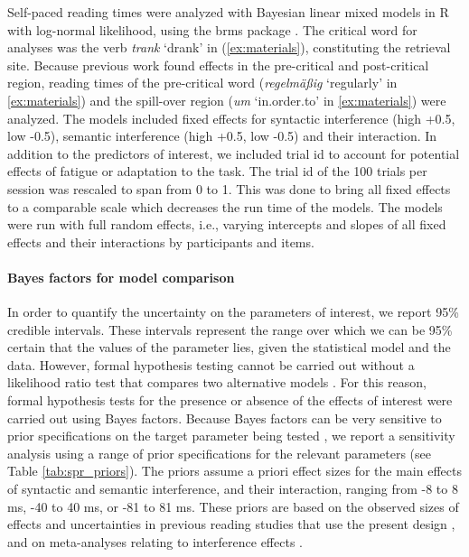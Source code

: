 \documentclass[review,preprint,12pt,authoryear,floatsintext]{elsarticle}
\begin{document}
Self-paced reading times were analyzed with Bayesian linear mixed models in R \citep{r} with log-normal likelihood, using the brms package \citep{brms}. The critical word for analyses was the verb \textit{trank} `drank' in (\ref{ex:materials}), constituting the retrieval site. Because previous work found effects in the pre-critical and post-critical region, reading times of the pre-critical word (\textit{regelmäßig} `regularly' in \ref{ex:materials}) and the spill-over region (\textit{um} `in.order.to' in \ref{ex:materials}) were analyzed. 
The models included fixed effects for syntactic interference (high +0.5, low -0.5), semantic interference (high +0.5, low -0.5) and their interaction. In addition to the predictors of interest, we included trial id to account for potential effects of fatigue or adaptation to the task. The trial id of the 100 trials per session was rescaled to span from 0 to 1. This was done to bring all fixed effects to a comparable scale which decreases the run time of the models. The models were run with full random effects, i.e., varying intercepts and slopes of all fixed effects and their interactions by participants and items.  

\paragraph{Bayes factors for model comparison}\label{BF_analysis_SPR}

In order to quantify the uncertainty on the parameters of interest, we report 95\% credible intervals. These intervals represent the range over which we can be 95\% certain that the values of the parameter lies, given the statistical model and the data. However, formal hypothesis testing cannot be carried out without a likelihood ratio test that compares two alternative models \citep{schad_etal_2022_BF,Royall}. For this reason, formal hypothesis tests for the presence or absence of the effects of interest were carried out using Bayes factors. Because Bayes factors can be very sensitive to prior specifications on the target parameter being tested \citep{schad_etal_2022_BF}, 
we report a sensitivity analysis using a range of prior specifications for the relevant parameters (see Table \ref{tab:spr_priors}). The priors assume a priori effect sizes for the main effects of syntactic and semantic interference, and their interaction, ranging from -8 to 8 ms, -40 to 40 ms, or -81 to 81 ms. These priors are based on the observed sizes of effects and uncertainties in previous reading studies that use the present design \citep{vandyke07,mertzen}, and on meta-analyses relating to interference effects \citep{jaeger_etal_2017}.
\end{document}
